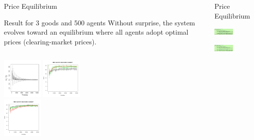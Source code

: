 \documentclass[final]{beamer}
\begin{document}
\begin{frame}
\begin{columns}
\begin{block}{Price Equilibrium}
			\begin{block}{Result for 3 goods and 500 agents}
				Without surprise, the system evolves toward an equilibrium where all agents adopt optimal prices (clearing-market prices). 
			\end{block}
			\begin{columns}
				\column{5cm}
				\includegraphics[height=2cm]{./ClearingPriceDistanceEvolutionForTrade-G3N500.pdf}
				\column{35cm}
				\includegraphics[width=2cm]{./scoreEx1.png}\\
				\includegraphics[width=2cm]{./scoreEx2.png}
			\end{columns}

		\end{block}



		\begin{block}{Price Equilibrium}
			\begin{center}
				\includegraphics[width=1cm]{./codePrices.png}\\
			\end{center}

			\begin{center}

				\includegraphics[width=1cm]{./codeNeeds.png}\\
			\end{center}
			\begin{center}


\end{center}
\end{block}
\end{columns}
\end{frame}
\end{document}
